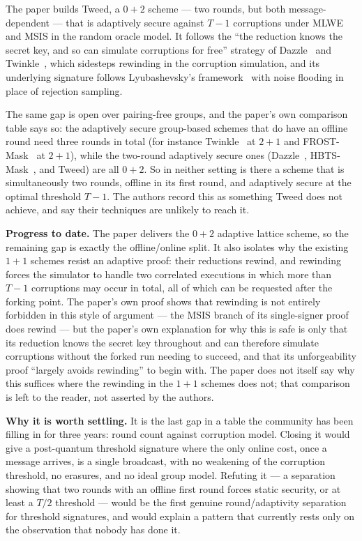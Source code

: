 \documentclass{aicr-conjecture}
\begin{document}
The paper builds Tweed, a $0+2$ scheme --- two rounds, but both
message-dependent --- that is adaptively secure against $T-1$
corruptions under MLWE and MSIS in the random oracle model. It follows
the ``the reduction knows the secret key, and so can simulate
corruptions for free'' strategy of Dazzle~\cite{Che25a} and
Twinkle~\cite{BLT24}, which sidesteps rewinding in the corruption
simulation, and its underlying signature follows Lyubashevsky's
framework~\cite{Lyu12} with noise flooding in place of rejection
sampling.

The same gap is open over pairing-free groups, and the paper's own
comparison table says so: the adaptively secure group-based schemes
that do have an offline round need three rounds in total (for instance
Twinkle~\cite{BLT24} at $2+1$ and FROST-Mask~\cite{Che25b} at $2+1$),
while the two-round adaptively secure ones (Dazzle~\cite{Che25a},
HBTS-Mask~\cite{Che25b}, and Tweed) are all $0+2$. So in neither
setting is there a scheme that is simultaneously two rounds, offline in
its first round, and adaptively secure at the optimal threshold $T-1$.
The authors record this as something Tweed does not achieve, and say
their techniques are unlikely to reach it.

\smallskip\noindent\textbf{Progress to date.} The paper delivers the
$0+2$ adaptive lattice scheme, so the remaining gap is exactly the
offline/online split. It also isolates why the existing $1+1$ schemes
resist an adaptive proof: their reductions rewind, and rewinding forces
the simulator to handle two correlated executions in which more than
$T-1$ corruptions may occur in total, all of which can be requested
after the forking point. The paper's own proof shows that rewinding is
not entirely forbidden in this style of argument --- the MSIS branch of
its single-signer proof does rewind --- but the paper's own explanation
for why this is safe is only that its reduction knows the secret key
throughout and can therefore simulate corruptions without the forked
run needing to succeed, and that its unforgeability proof ``largely
avoids rewinding'' to begin with. The paper does not itself say why
this suffices where the rewinding in the $1+1$ schemes does not; that
comparison is left to the reader, not asserted by the authors.

\smallskip\noindent\textbf{Why it is worth settling.} It is the last
gap in a table the community has been filling in for three years: round
count against corruption model. Closing it would give a post-quantum
threshold signature where the only online cost, once a message arrives,
is a single broadcast, with no weakening of the corruption threshold,
no erasures, and no ideal group model. Refuting it --- a separation
showing that two rounds with an offline first round forces static
security, or at least a $T/2$ threshold --- would be the first genuine
round/adaptivity separation for threshold signatures, and would explain
a pattern that currently rests only on the observation that nobody has
done it.
\end{document}
